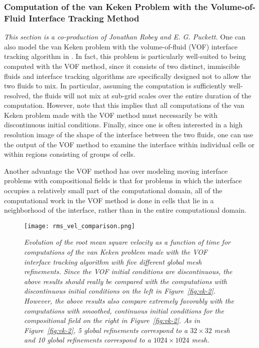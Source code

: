 \subsubsection{Computation of the van Keken Problem with the Volume-of-Fluid Interface Tracking Method}
\label{sec:van-keken VOF interface tracking}

\textit{This section is a co-production of Jonathan Robey and E. G. Puckett.}
One can also model the van Keken problem with the volume-of-fluid (VOF) interface tracking 
algorithm in \aspect{}.
In fact, this problem is particularly well-suited to being computed with the VOF method, since 
it consists of two distinct, immiscible fluids and interface tracking algorithms are 
specifically designed not to allow the two fluids to mix.
In particular, assuming the computation is sufficiently well-resolved, the fluids will not mix 
at sub-grid scales over the entire duration of the computation.
However, note that this implies that all computations of the van Keken problem made with the VOF 
method must necessarily be with discontinuous initial conditions.
Finally, since one is often interested in a high resolution image of the shape of the interface 
between the two fluids, one can use the output of the VOF method to examine the interface 
within individual cells or within regions consisting of groups of cells.

Another advantage the VOF method has over modeling moving interface problems with compositional 
fields is that for problems in which the interface occupies a relatively small part of the 
computational domain, all of the computational work in the VOF method is done in cells that lie 
in a neighborhood of the interface, rather than in the entire computational domain. 

\begin{figure}
   \centering
\texttt{[image: rms\_vel\_comparison.png]}
   \caption{\it Evolution of the root mean square velocity as a function of time for computations 
    of the van Keken problem made with the VOF interface tracking algorithm with five 
    different global mesh refinements.
    Since the VOF initial conditions are discontinuous, the above results should really be 
    compared with the computations with discontinuous initial conditions on the left in 
    Figure~\ref{fig:vk-2}. However, the above results also compare extremely favorably with the 
    computations with smoothed, continuous initial conditions for the compositional field on 
    the right in Figure~\ref{fig:vk-2}.
    As in Figure~\ref{fig:vk-2}, 5 global refinements correspond to a $32 \times 32$ mesh and 10 global refinements correspond to a $1024 \times 1024$ mesh.}
    \label{fig:vof-vk-1}
\end{figure}

